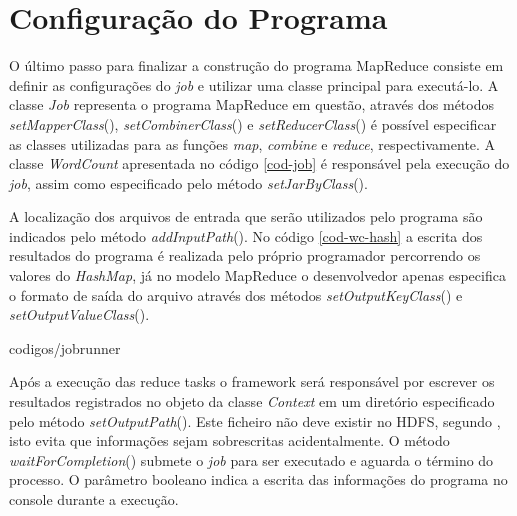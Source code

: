 \section{Configuração do Programa}

O último passo para finalizar a construção do programa MapReduce consiste em definir as configurações do \textit{job} e utilizar uma classe principal para executá-lo. A classe \textit{Job} representa o programa MapReduce em questão, através dos métodos \textit{setMapperClass}(), \textit{setCombinerClass}() e \textit{setReducerClass}() é possível especificar as classes utilizadas para as funções \textit{map}, \textit{combine} e \textit{reduce}, respectivamente. A classe \textit{WordCount} apresentada no código \ref{cod-job} é responsável pela execução do \textit{job}, assim como especificado pelo método \textit{setJarByClass}().

A localização dos arquivos de entrada que serão utilizados pelo programa são indicados pelo método \textit{addInputPath}(). No código \ref{cod-wc-hash} a escrita dos resultados do programa é realizada pelo próprio programador percorrendo os valores do \textit{HashMap}, já no modelo MapReduce o desenvolvedor apenas especifica o formato de saída do arquivo através dos métodos \textit{setOutputKeyClass}() e \textit{setOutputValueClass}().


		{codigos/jobrunner}

Após a execução das reduce tasks o framework será responsável por escrever os resultados registrados no objeto da classe \textit{Context} em um diretório  especificado pelo método \textit{setOutputPath}(). Este ficheiro não deve existir no HDFS, segundo , isto evita que informações sejam sobrescritas acidentalmente. O método \textit{waitForCompletion}() submete o \textit{job} para ser executado e aguarda o término do processo. O parâmetro booleano indica a escrita das informações do programa no console durante a execução.


